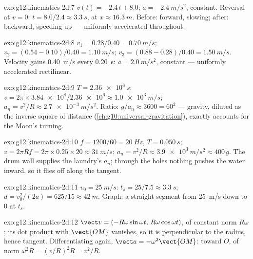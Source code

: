 \begin{solution}{exo:g12:kinematics-2d:7}
$v(t) = -2.4\,t + 8.0$; $a = \qty{-2.4}{m/s^2}$, constant. Reversal
at $v = 0$: $t = 8.0/2.4 \approx \qty{3.3}{s}$, at
$x \approx \qty{16.3}{m}$. Before: forward, slowing; after: backward,
speeding up --- uniformly accelerated throughout.
\end{solution}

\begin{solution}{exo:g12:kinematics-2d:8}
$v_1 = 0.28/0.40 = \qty{0.70}{m/s}$;
$v_2 = (0.54 - 0.10)/0.40 = \qty{1.10}{m/s}$;
$v_3 = (0.88 - 0.28)/0.40 = \qty{1.50}{m/s}$. Velocity gains
\qty{0.40}{m/s} every \qty{0.20}{s}: $a = \qty{2.0}{m/s^2}$, constant
--- uniformly accelerated rectilinear.
\end{solution}

\begin{solution}{exo:g12:kinematics-2d:9}
$T = \qty{2.36e6}{s}$: $v = 2\pi \times \num{3.84e8}/\num{2.36e6}
\approx \qty{1.0e3}{m/s}$;
$a_n = v^2/R \approx \qty{2.7e-3}{m/s^2}$. Ratio:
$g/a_n \approx 3600 = 60^2$ --- gravity, diluted as the inverse
square of distance (\cref{ch:g10:universal-gravitation}), exactly
accounts for the Moon's turning.
\end{solution}

\begin{solution}{exo:g12:kinematics-2d:10}
$f = 1200/60 = \qty{20}{Hz}$, $T = \qty{0.050}{s}$;
$v = 2\pi R f = 2\pi \times 0.25 \times 20 \approx \qty{31}{m/s}$;
$a_n = v^2/R \approx \qty{3.9e3}{m/s^2} \approx 400\,g$. The drum
wall supplies the laundry's $a_n$; through the holes nothing pushes
the water inward, so it flies off along the tangent.
\end{solution}

\begin{solution}{exo:g12:kinematics-2d:11}
$v_0 = \qty{25}{m/s}$: $t_s = 25/7.5 \approx \qty{3.3}{s}$;
$d = v_0^2/(2a) = 625/15 \approx \qty{42}{m}$. Graph: a straight
segment from \qty{25}{m/s} down to $0$ at $t_s$.
\end{solution}

\begin{solution}{exo:g12:kinematics-2d:12}
$\vect v = (-R\omega\sin\omega t,\, R\omega\cos\omega t)$, of
constant norm $R\omega$; its dot product with $\vect{OM}$ vanishes,
so it is perpendicular to the radius, hence tangent. Differentiating
again, $\vect a = -\omega^2\vect{OM}$: toward $O$, of norm
$\omega^2 R = (v/R)^2 R = v^2/R$.
\end{solution}

